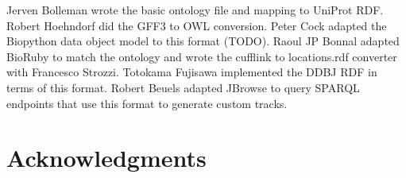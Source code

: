\documentclass[10pt]{bmc_article}
\newenvironment{bmcformat}{\begin{raggedright}\baselineskip20pt\sloppy\setboolean{publ}{false}}{\end{raggedright}\baselineskip20pt\sloppy}
\begin{document}
\begin{bmcformat}
Jerven Bolleman wrote the basic ontology file and mapping to UniProt RDF.
Robert Hoehndorf did the GFF3 to OWL conversion.
Peter Cock adapted the Biopython data object model to this format (TODO).
Raoul JP Bonnal adapted BioRuby to match the ontology and wrote the cufflink to locations.rdf converter with Francesco Strozzi.
Totokama Fujisawa implemented the DDBJ RDF in terms of this format.
Robert Beuels adapted JBrowse to query SPARQL endpoints that use this format to generate custom tracks. 

\section*{Acknowledgments}



\newpage
{
   }     %
  
\end{bmcformat}
\end{document}
